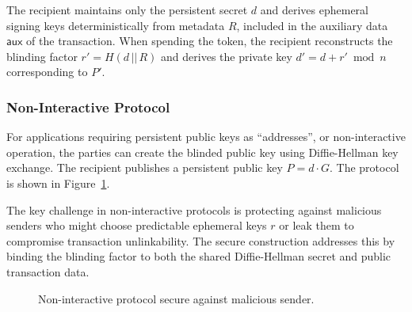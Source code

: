\documentclass{article}
\newcommand{\auxd}[0]{\mathsf{aux}}
\begin{document}
The recipient maintains only the persistent secret $d$ and derives ephemeral signing keys deterministically from metadata $R$, included in the auxiliary data $\auxd$ of the transaction. When spending the token, the recipient reconstructs the blinding factor $r' = H(d \,||\, R)$ and derives the private key $d' = d + r' \bmod n$ corresponding to $P'$.

\subsubsection{Non-Interactive Protocol}

For applications requiring persistent public keys as ``addresses'', or non-interactive operation, the parties can create the blinded public key using Diffie-Hellman key exchange. The recipient publishes a persistent public key $P = d \cdot G$. The protocol is shown in Figure~\ref{fig:protocol3}.

The key challenge in non-interactive protocols is protecting against malicious senders who might choose predictable ephemeral keys $r$ or leak them to compromise transaction unlinkability. The secure construction addresses this by binding the blinding factor to both the shared Diffie-Hellman secret and public transaction data.

\begin{figure}[ht]
\centering
{}
\caption{Non-interactive protocol secure against malicious sender.}
\label{fig:protocol3}
\end{figure}
\end{document}

